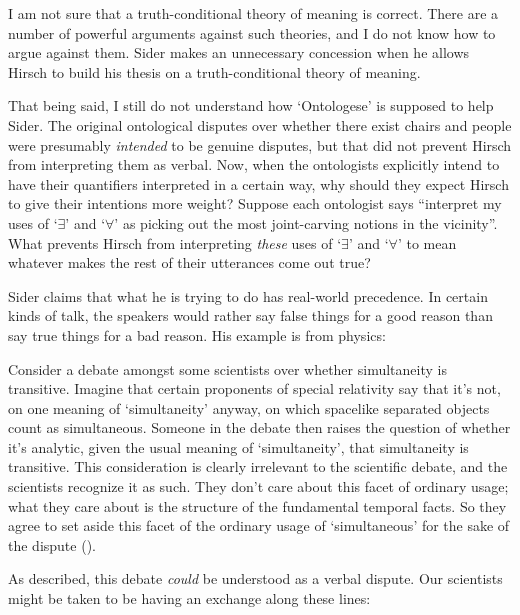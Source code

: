 \documentclass[11pt]{article}
\newenvironment{squote}{%
\begin{spacing}{1}
       	\begin{list}{}{%
\setlength{\labelwidth}{0pt}%
\rightmargin\leftmargin%
}
\item\relax
}{%
\end{list}%
\end{spacing}
}
\begin{document}
\begin{spacing}{1.25}
I am not sure that a truth-conditional theory of meaning is correct.
There are a number of powerful arguments against such theories, and I
do not know how to argue against them.  Sider makes an unnecessary
concession when he allows Hirsch to build his thesis on a
truth-conditional theory of meaning.

That being said, I still do not understand how `Ontologese' is
supposed to help Sider.  The original ontological disputes over
whether there exist chairs and people were presumably {\em intended}
to be genuine disputes, but that did not prevent Hirsch from
interpreting them as verbal.  Now, when the ontologists explicitly
intend to have their quantifiers interpreted in a certain way, why
should they expect Hirsch to give their intentions more weight?
Suppose each ontologist says ``interpret my uses of `$\exists$' and
`$\forall$' as picking out the most joint-carving notions in the
vicinity''.  What prevents Hirsch from interpreting {\em these} uses
of `$\exists$' and `$\forall$' to mean whatever makes the rest of
their utterances come out true?

Sider claims that what he is trying to do has real-world precedence.
In certain kinds of talk, the speakers would rather say false things
for a good reason than say true things for a bad reason.  His example
is from physics:

\begin{squote}
Consider a debate amongst some scientists over whether simultaneity is
transitive.  Imagine that certain proponents of special relativity say
that it's not, on one meaning of `simultaneity' anyway, on which
spacelike separated objects count as simultaneous.  Someone in the
debate then raises the question of whether it's analytic, given the
usual meaning of `simultaneity', that simultaneity is transitive.
This consideration is clearly irrelevant to the scientific debate, and
the scientists recognize it as such.  They don't care about this facet
of ordinary usage; what they care about is the structure of the
fundamental temporal facts.  So they agree to set aside this facet of
the ordinary usage of `simultaneous' for the sake of the dispute
(\citeyear[4]{sider2011b}).
\end{squote}

As described, this debate {\em could} be understood as a verbal
dispute.  Our scientists might be taken to be having an exchange along
these lines:



\end{spacing}
\end{document}
